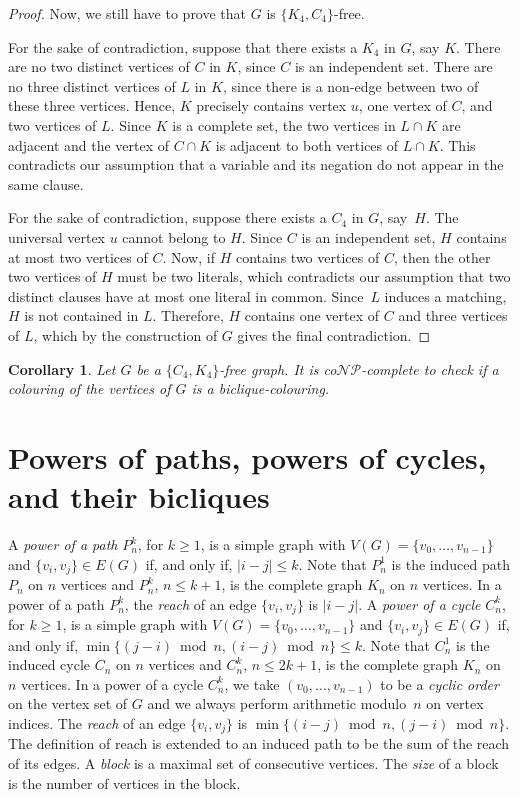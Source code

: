 \documentclass{article}
\newtheorem{corollary}[theorem]{Corollary}
\begin{document}
\begin{proof}
	Now, we still have to prove that $G$ is $\{K_4, C_4\}$-free. 
	
	For the sake of contradiction, suppose that there exists a $K_4$ in $G$, say
	$K$. There are no two distinct vertices of $C$ in $K$, since $C$ is an independent set. There
	are no three distinct vertices of $L$ in $K$, since there is a non-edge
	between two of these three vertices. Hence, $K$ precisely contains vertex $u$,
	one vertex of $C$, and two vertices of $L$. Since $K$ is a complete set, the
	two vertices in $L \cap K$ are adjacent and the vertex of $C \cap K$ is adjacent
	to both vertices of $L \cap K$. This contradicts our assumption that a
	variable and its negation do not appear in the same clause. 
	
	For the sake of contradiction, suppose
	there exists a $C_4$ in $G$, say~$H$. The universal vertex $u$
	cannot belong to $H$. Since $C$ is an independent set, $H$ contains at most
	two vertices of $C$. Now, if $H$ contains two vertices of $C$, then the other
	two vertices of $H$ must be two literals, which contradicts our assumption that
	two distinct clauses have at most one literal in common. Since~$L$
	induces a matching, $H$ is not contained in $L$. Therefore, $H$ contains
	one vertex of $C$ and three vertices of $L$, which by the construction of
	$G$ gives the final contradiction.	
	\end{proof}

\begin{corollary}
\label{cor:checkbicliquecolouring}
Let $G$ be a $\{C_4, K_4\}$-free graph. It is co$\mathcal{NP}$-complete to check
if a colouring of the vertices of $G$ is a biclique-colouring.
\end{corollary}


\section{Powers of paths, powers of cycles, and their bicliques}
\label{sec:powerofcyclesandbicliques}
A \emph{power of a path} $P_n^{k}$, for $k \geq 1$, is a simple
graph with $V(G)= \{v_0,\dots, v_{n-1}\}$ and $\{v_i,v_j\}\in E(G)$ if,
and only if, $|i-j| \leq k$. Note that $P_{n}^{1}$ is the induced path $P_n$ on
$n$ vertices and $P_{n}^{k}$, $n \leq k + 1$, is the complete graph $K_{n}$ on $n$
vertices. 
In a power of a path $P_n^k$, the \emph{reach} of an edge $\{v_i,v_j\}$ is $|i -
j|$. A \emph{power of a cycle} $C_n^{k}$, for $k \geq 1$, is a
simple graph with $V(G)= \{v_0,\dots, v_{n-1}\}$ and $\{v_i,v_j\}\in E(G)$ if,
and only if, $\min\{(j-i)\bmod n,(i-j)\bmod n\} \leq k$. Note that $C_{n}^{1}$
is the induced cycle $C_n$ on $n$ vertices and $C_{n}^{k}$, $n \leq 2k + 1$,
is the complete graph $K_{n}$ on $n$ vertices. 
In a power of a cycle $C_n^k$, we take $(v_0,\dots,v_{n-1})$ to be a
\emph{cyclic order} on the vertex set of $G$ and we always perform arithmetic modulo~$n$ on
vertex indices. The \emph{reach} of an edge $\{v_i, v_j\}$ is $\min\{(i-j)\bmod
n, (j-i)\bmod n\}$. The definition of reach is extended to an induced path to be
the sum of the reach of its edges. A \emph{block} is a maximal set of
consecutive vertices. The \emph{size} of a block is the number of vertices in
the block.
\end{document}
